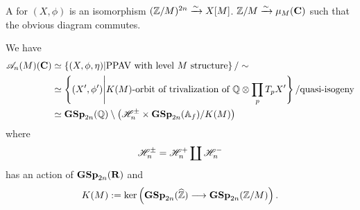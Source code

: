 \begin{definition}
	A  for $(X,\phi)$ is an isomorphism $(\mathbb Z /M)^{2n}\xrightarrow{\sim} X[M]$. $\mathbb Z /M\xrightarrow{\sim} \mu_M(\mathbf{C})$ such that the obvious diagram commutes.
\end{definition}
We have
\begin{align*}
	\mathscr{A}_n(M)(\mathbf{C}) &\simeq \left\{ (X,\phi,\eta) \middle| \text{PPAV with level }M\text{ structure} \right\} / \sim \\
			 &\simeq \left\{ (X',\phi') \middle| K(M)\text{-orbit of trivalization of }\mathbb Q\otimes \prod_p T_pX' \right\} / \text{quasi-isogeny} \\
			 &\simeq \mathbf{GSp}_{2n}(\mathbb Q) \setminus \left( \mathscr H_n^{\pm}\times \mathbf{GSp}_{2n}(\mathbb{A}_f) /K(M) \right) 
\end{align*}
where
\[
	\mathscr H_n^{\pm} = \mathscr H_n^{+} \coprod \mathscr H_n^{-}
\] 
has an action of $\mathbf{GSp}_{2n}(\mathbf{R})$ and
\[
	K(M) \defeq \ker \left( \GSp_{2n}(\wh{\Z}) \to \GSp_{2n}(\Z /M) \right) .
\] 


